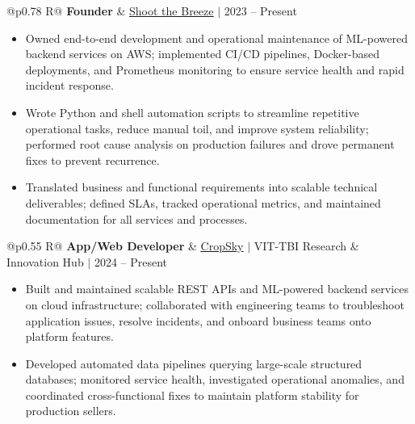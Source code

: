 \documentclass[a4paper,10pt]{article}
\newcommand{\ulink}[2]{\href{#1}{\uline{#2}}}
\newcommand{\subheading}[1]{{\color[HTML]{0A0A0A}\fontsize{12}{14}\selectfont\bfseries #1}}
\newcommand{\meta}[1]{{\color[HTML]{5C5C5C}\fontsize{10.5}{12.5}\selectfont #1}}
\begin{document}
\begin{tabularx}{\linewidth}{@{}p{0.78\linewidth} R@{}}
\subheading{Founder} & \meta{\ulink{https://shoot-the-breeze.vercel.app}{Shoot the Breeze} $|$ 2023 -- Present}
\end{tabularx}
\begin{itemize}[nosep, leftmargin=1.5em, itemsep=1pt, topsep=2pt]
\item {\color[HTML]{0A0A0A}\fontsize{11}{14}\selectfont
Owned end-to-end development and operational maintenance of ML-powered backend services on AWS; implemented CI/CD pipelines, Docker-based deployments, and Prometheus monitoring to ensure service health and rapid incident response.}
\item {\color[HTML]{0A0A0A}\fontsize{11}{14}\selectfont
Wrote Python and shell automation scripts to streamline repetitive operational tasks, reduce manual toil, and improve system reliability; performed root cause analysis on production failures and drove permanent fixes to prevent recurrence.}
\item {\color[HTML]{0A0A0A}\fontsize{11}{14}\selectfont
Translated business and functional requirements into scalable technical deliverables; defined SLAs, tracked operational metrics, and maintained documentation for all services and processes.}
\end{itemize}

\vspace{2pt}

\begin{tabularx}{\linewidth}{@{}p{0.55\linewidth} R@{}}
\subheading{App/Web Developer} & \meta{\ulink{https://sites.google.com/view/cropsky/home}{CropSky} $|$ VIT-TBI Research \& Innovation Hub $|$ 2024 -- Present}
\end{tabularx}
\begin{itemize}[nosep, leftmargin=1.5em, itemsep=1pt, topsep=2pt]
\item {\color[HTML]{0A0A0A}\fontsize{11}{14}\selectfont
Built and maintained scalable REST APIs and ML-powered backend services on cloud infrastructure; collaborated with engineering teams to troubleshoot application issues, resolve incidents, and onboard business teams onto platform features.}
\item {\color[HTML]{0A0A0A}\fontsize{11}{14}\selectfont
Developed automated data pipelines querying large-scale structured databases; monitored service health, investigated operational anomalies, and coordinated cross-functional fixes to maintain platform stability for production sellers.}
\end{itemize}
\end{document}
